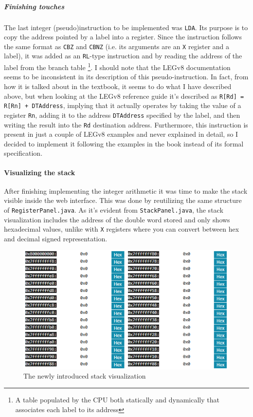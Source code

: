 \subparagraph*{Finishing touches}
The last integer (pseudo)instruction to be implemented was \verb|LDA|. Its purpose is to copy the address pointed by a label into a register. Since the instruction follows the same format as \verb|CBZ| and \verb|CBNZ| (i.e. its arguments are an \verb|X| register and a label), it was added as an \verb|RL|-type instruction and by reading the address of the label from the branch table \footnote{A table populated by the CPU both statically and dynamically that associates each label to its address}. I should note that the LEGv8 documentation seems to be inconsistent in its description of this pseudo-instruction. In fact, from how it is talked about in the textbook, it seems to do what I have described above, but when looking at the LEGv8 reference guide it's described as \verb|R[Rd] = R[Rn] + DTAddress|, implying that it actually operates by taking the value of a register \verb|Rn|, adding it to the address \verb|DTAddress| specified by the label, and then writing the result into the \verb|Rd| destination address. Furthermore, this instruction is present in just a couple of LEGv8 examples and never explained in detail, so I decided to implement it following the examples in the book instead of its formal specification.

\paragraph*{Visualizing the stack}

After finishing implementing the integer arithmetic it was time to make the stack visible inside the web interface. This was done by reutilizing the same structure of \verb|RegisterPanel.java|. As it's evident from \verb|StackPanel.java|, the stack visualization includes the address of the double word stored and only shows hexadecimal values, unlike with \verb|X| registers where you can convert between hex and decimal signed representation.

\begin{figure}[H]
	\centering
	\includegraphics[width=.8\textwidth]{img/stack_vis.png}
	\caption{The newly introduced stack visualization}
\end{figure}


